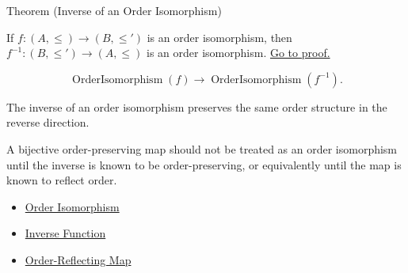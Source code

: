 \begin{theorembox}{Theorem (Inverse of an Order Isomorphism)}
\begin{theorem}\label{thm:inverse-order-isomorphism}
If $f:(A,\leq)\to(B,\leq')$ is an order isomorphism, then
$f^{-1}:(B,\leq')\to(A,\leq)$ is an order isomorphism.
\hyperref[prf:inverse-order-isomorphism]{Go to proof.}
\end{theorem}
\end{theorembox}

\begin{remark*}
\[
  \operatorname{OrderIsomorphism}(f)\to \operatorname{OrderIsomorphism}(f^{-1}).
\]
\end{remark*}

\begin{remark*}[Interpretation]
The inverse of an order isomorphism preserves the same order structure in the
reverse direction.
\end{remark*}

\begin{remark*}[Exposition]
A bijective order-preserving map should not be treated as an order isomorphism
until the inverse is known to be order-preserving, or equivalently until the
map is known to reflect order.
\end{remark*}

\begin{dependencies}
\begin{itemize}
  \item \hyperref[def:order-isomorphism-ordered-sets]{Order Isomorphism}
  \item \hyperref[def:inverse]{Inverse Function}
  \item \hyperref[def:order-reflecting-map]{Order-Reflecting Map}
\end{itemize}
\end{dependencies}
